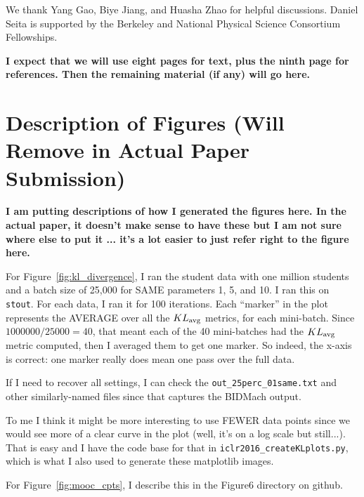 \documentclass{article} %
\begin{document}
We thank Yang Gao, Biye Jiang, and Huasha Zhao for helpful discussions. Daniel Seita is supported by
the Berkeley and National Physical Science Consortium Fellowships.











\clearpage
\appendix

\textbf{I expect that we will use eight pages for text, plus the ninth page for references. Then the
remaining material (if any) will go here.}

\section{Description of Figures (Will Remove in Actual Paper Submission)}

\textbf{I am putting descriptions of how I generated the figures here. In the actual paper, it
doesn't make sense to have these but I am not sure where else to put it ... it's a lot easier to
just refer right to the figure here.}

For Figure~\ref{fig:kl_divergence}, I ran the student data with one million students and a batch
size of 25,000 for SAME parameters 1, 5, and 10. I ran this on \texttt{stout}. For each data, I ran
it for 100 iterations. Each ``marker'' in the plot represents the AVERAGE over all the $KL_{\rm
avg}$ metrics, for each mini-batch. Since $1000000/25000=40$, that meant each of the 40 mini-batches
had the $KL_{\rm avg}$ metric computed, then I averaged them to get one marker. So indeed, the
x-axis is correct: one marker really does mean one pass over the full data.

If I need to recover all settings, I can check the \texttt{out\_25perc\_01same.txt} and other
similarly-named files since that captures the BIDMach output.

To me I think it might be more interesting to use FEWER data points since we would see more of a
clear curve in the plot (well, it's on a log scale but still...). That is easy and I have the code
base for that in \texttt{iclr2016\_createKLplots.py}, which is what I also used to generate these
matplotlib images.

For Figure~\ref{fig:mooc_cpts}, I describe this in the Figure6 directory on github.
\end{document}
